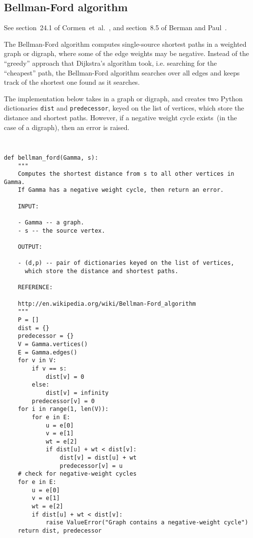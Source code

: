 
\subsection{Bellman-Ford algorithm}

See section~24.1 of Cormen~et~al.~\cite{CormenEtAl2001}, and
section~8.5 of Berman and Paul~\cite{BermanPaul1997}.

The Bellman-Ford algorithm computes single-source shortest paths in a
weighted graph or digraph, where some of the edge weights may be
negative. Instead of the ``greedy'' approach that Dijkstra's algorithm
took, i.e. searching for the ``cheapest'' path, the Bellman-Ford
algorithm searches over all edges and keeps track of the shortest one
found as it searches.

The implementation below takes in a graph or digraph, and creates two
Python dictionaries \verb!dist! and \verb!predecessor!, keyed on the
list of vertices, which store the distance and shortest
paths. However, if a negative weight cycle exists~(in the case of a
digraph), then an error is raised.

\begin{center}
\fontsize{9pt}{9pt}
\selectfont
\tt
\begin{lstlisting}
def bellman_ford(Gamma, s):
    """
    Computes the shortest distance from s to all other vertices in Gamma.
    If Gamma has a negative weight cycle, then return an error.

    INPUT:

    - Gamma -- a graph.
    - s -- the source vertex.

    OUTPUT:

    - (d,p) -- pair of dictionaries keyed on the list of vertices,
      which store the distance and shortest paths.

    REFERENCE:

    http://en.wikipedia.org/wiki/Bellman-Ford_algorithm
    """
    P = []
    dist = {}
    predecessor = {}
    V = Gamma.vertices()
    E = Gamma.edges()
    for v in V:
        if v == s:
            dist[v] = 0
        else:
            dist[v] = infinity
        predecessor[v] = 0
    for i in range(1, len(V)):
        for e in E:
            u = e[0]
            v = e[1]
            wt = e[2]
            if dist[u] + wt < dist[v]:
                dist[v] = dist[u] + wt
                predecessor[v] = u
    # check for negative-weight cycles
    for e in E:
        u = e[0]
        v = e[1]
        wt = e[2]
        if dist[u] + wt < dist[v]:
            raise ValueError("Graph contains a negative-weight cycle")
    return dist, predecessor
\end{lstlisting}
\end{center}

